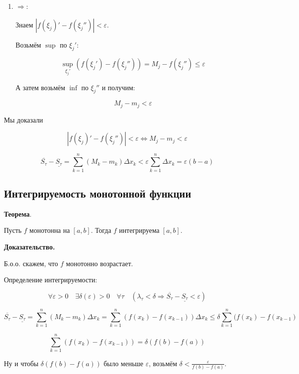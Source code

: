 \documentclass[a4paper]{article}
\begin{document}
\begin{definit}
\begin{hproof}
\begin{enumerate}
\item $\Rightarrow$:

Знаем $|f(\xi_j)' - f(\xi_j'')| < \varepsilon$.

Возьмём $\sup$ по $\xi_j'$:

\[
	\sup_{\xi_j'}(f(\xi_j') - f(\xi_j'')) = M_j - f(\xi_j'') \leq \varepsilon
\]

А затем возьмём $\inf$ по $\xi_j''$ и получим:

\[
M_j - m_j < \varepsilon
\]

\end{enumerate}

Мы доказали 

\[
|f(\xi_j)' - f(\xi_j'')| < \varepsilon \Leftrightarrow M_j - m_j < \varepsilon
\]

\[
\overline{S_\tau} - \underline{S_\tau} = \sum_{k=1}^n (M_k-m_k) \Delta x_k < \varepsilon \sum_{k=1}^n \Delta x_k = \varepsilon (b-a)
\]
\end{hproof}


\end{definit}


\begin{definit}
\hypertarget{p8}{}
\subsection*{Интегрируемость монотонной функции}

\begin{htheorem}\textbf{Теорема}.

Пусть $f$ монотонна на $[a,b]$. Тогда $f$ интегрируема $[a,b]$.
\end{htheorem}

\begin{hproof}\textbf{Доказательство.}

Б.о.о. скажем, что $f$ монотонно возрастает.

Определение интегрируемости:

\[
\forall \varepsilon > 0 \quad \exists \delta(\varepsilon) > 0 \quad \forall \tau \quad (\lambda_\tau < \delta \Rightarrow \overline{S_\tau} - \underline{S_\tau} < \varepsilon)
\]

\[
\overline{S_\tau} - \underline{S_\tau} = \sum_{k=1}^n (M_k-m_k) \Delta x_k = \sum_{k=1}^n (f(x_k) - f(x_{k-1})) \Delta x_k \leq \delta \sum_{k=1}^n (f(x_k) - f(x_{k-1})
\]

\[
\sum_{k=1}^n (f(x_k) - f(x_{k-1})) = \delta (f(b)-f(a))
\]

Ну и чтобы $\delta (f(b)-f(a))$ было меньше $\varepsilon$, возьмём $\delta < \frac{\varepsilon}{f(b)-f(a)}$.
\end{hproof}
\end{definit}
\end{document}
